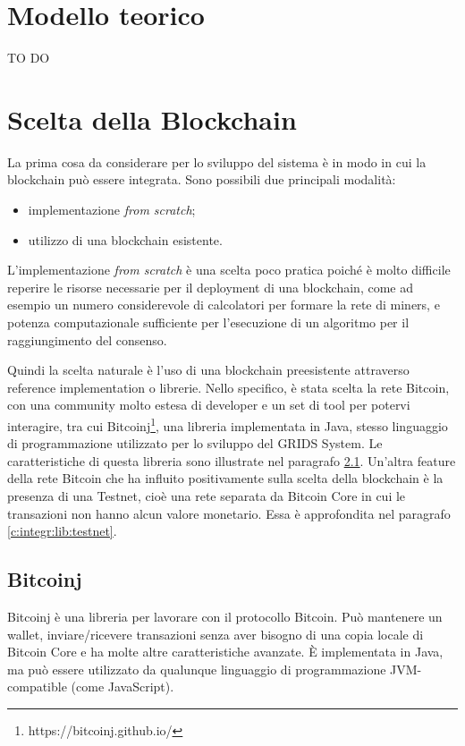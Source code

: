 \section{Modello teorico}
\label{c:integr:model}

TO DO

\section{Scelta della Blockchain}
\label{c:integr:lib}

La prima cosa da considerare per lo sviluppo del sistema è in modo in cui la blockchain può essere integrata. Sono possibili due principali modalità:
\begin{itemize}
    \item implementazione \textit{from scratch};
    \item utilizzo di una blockchain esistente.
\end{itemize}

L'implementazione \textit{from scratch} è una scelta poco pratica poiché è molto difficile reperire le risorse necessarie per il deployment di una blockchain, come ad esempio un numero considerevole di calcolatori per formare la rete di miners, e potenza computazionale sufficiente per l'esecuzione di un algoritmo per il raggiungimento del consenso.

Quindi la scelta naturale è l'uso di una blockchain preesistente attraverso reference implementation o librerie. Nello specifico, è stata scelta la rete Bitcoin, con una community molto estesa di developer e un set di tool per potervi interagire, tra cui Bitcoinj\footnote{https://bitcoinj.github.io/}, una libreria implementata in Java, stesso linguaggio di programmazione utilizzato per lo sviluppo del GRIDS System. Le caratteristiche di questa libreria sono illustrate nel paragrafo \ref{c:integr:lib:bitcoinj}.
Un'altra feature della rete Bitcoin che ha influito positivamente sulla scelta della blockchain è la presenza di una Testnet, cioè una rete separata da Bitcoin Core in cui le transazioni non hanno alcun valore monetario. Essa è approfondita nel paragrafo \ref{c:integr:lib:testnet}.


\subsection{Bitcoinj}
\label{c:integr:lib:bitcoinj}

Bitcoinj è una libreria per lavorare con il protocollo Bitcoin. Può mantenere un wallet, inviare/ricevere transazioni senza aver bisogno di una copia locale di Bitcoin Core e ha molte altre caratteristiche avanzate. È implementata in Java, ma può essere utilizzato da qualunque linguaggio di programmazione JVM-compatible (come JavaScript).

